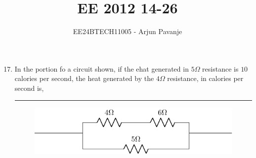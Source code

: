 \documentclass[journal]{IEEEtran}
\begin{document}

\vspace{3cm}
	
\title{EE 2012 14-26}
\author{EE24BTECH11005 - Arjun Pavanje}

{\let\newpage\relax\maketitle}
\begin{enumerate}
		\setcounter{enumi}{16}
	\item In the portion fo a circuit shown, if the ehat generated in $5\Omega$ resistance is $10$ calories per second, the heat generated by the $4\Omega$ resistance, in calories per second is, \rule{2cm}{0.2pt}
\begin{figure}[H]
			\centering
			\includegraphics[scale=0.5]{figs/q17.png}
			\label{stemplot}
		\end{figure}


\end{enumerate}
\end{document}
